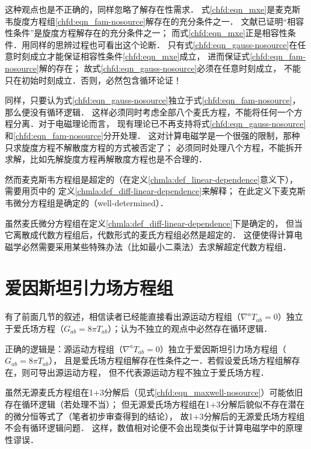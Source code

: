 这种观点也是不正确的，同样忽略了解存在性需求．
式\eqref{chfd:eqn_mxe}是麦克斯韦旋度方程组\eqref{chfd:eqn_fam-nosource}解存在的充分条件之一．
文献\parencite{aramaki-2014}已证明“相容性条件”是旋度方程解存在的充分条件之一；
而式\eqref{chfd:eqn_mxe}正是相容性条件．用同样的思辨过程也可看出这个论断．
只有式\eqref{chfd:eqn_gauss-nosource}在任意时刻成立才能保证相容性条件\eqref{chfd:eqn_mxe}成立，
进而保证式\eqref{chfd:eqn_fam-nosource}解的存在；
故式\eqref{chfd:eqn_gauss-nosource}必须在任意时刻成立，
不能只在初始时刻成立．否则，必然包含循环论证！


同样，只要认为式\eqref{chfd:eqn_gauss-nosource}独立于式\eqref{chfd:eqn_fam-nosource}，那么便没有循环逻辑．
这样必须同时考虑全部八个麦氏方程，不能将任何一个方程分离．对于电磁理论而言，
{\fangsong 现有理论已不再支持将式\eqref{chfd:eqn_gauss-nosource}和\eqref{chfd:eqn_fam-nosource}分开处理．}
{\kaishu 这对计算电磁学是一个很强的限制，那种只求旋度方程不解散度方程的方式被{\heiti 否定}了；
	必须同时处理八个方程，不能拆开求解，比如先解旋度方程再解散度方程也是不合理的．}

然而麦克斯韦方程组是超定的（在定义\ref{chmla:def_linear-dependence}意义下），
需要用\pageref{chmla:def_diff-linear-dependence}页中的
定义\ref{chmla:def_diff-linear-dependence}来解释；
在此定义下麦克斯韦微分方程组是{\kaishu 确定}的（well-determined）．

虽然麦氏微分方程组在定义\ref{chmla:def_diff-linear-dependence}下是{\kaishu 确定}的，
但当它离散成代数方程组后，代数形式的麦氏方程组必然是超定的．
这便使得计算电磁学必然需要采用某些特殊办法（比如最小二乘法）去求解超定代数方程组．








\section{爱因斯坦引力场方程组}

有了前面几节的叙述，相信读者已经能直接看出源运动方程组（$\nabla^a T_{ab}=0$）独立
于爱氏场方程（$G_{ab}=8\pi T_{ab}$）；认为不独立的观点中必然存在循环逻辑．

正确的逻辑是：源运动方程组（$\nabla^a T_{ab}=0$）独立于爱因斯坦引力场方程组（$G_{ab}=8\pi T_{ab}$），
且是爱氏场方程组解存在性条件之一．若假设爱氏场方程组解存在，则可导出源运动方程，
但不代表源运动方程不独立于爱氏场方程．



虽然无源麦氏方程组在1+3分解后（见式\eqref{chfd:eqn_maxwell-nosource}）可能依旧存在循环逻辑（若处理不当）；
但无源爱氏场方程组在1+3分解后貌似不存在潜在的微分恒等式了（笔者初步审查得到的结论），
故1+3分解后的无源爱氏场方程组不会有循环逻辑问题．
这样，数值相对论便不会出现类似于计算电磁学中的原理性谬误．

